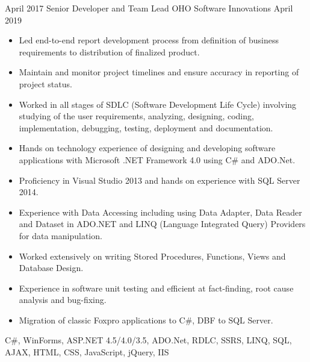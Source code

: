 \begin{experiences}
    \experience
        {April 2017}
        {Senior Developer and Team Lead}
        {OHO Software Innovations}
        {April 2019}
        {
            \begin{itemize}
                \item Led end-to-end report development process from definition of business requirements to distribution of finalized product.
                \item Maintain and monitor project timelines and ensure accuracy in reporting of project status.
                \item Worked in all stages of SDLC (Software Development Life Cycle) involving studying of the user requirements, analyzing, designing, coding, implementation, debugging, testing, deployment and documentation.
                \item Hands on technology experience of designing and developing software applications with Microsoft .NET Framework 4.0 using C# and ADO.Net.
                \item Proficiency in Visual Studio 2013 and hands on experience with SQL Server 2014.
                \item Experience with Data Accessing including using Data Adapter, Data Reader and Dataset in ADO.NET and LINQ (Language Integrated Query) Providers for data manipulation.
                \item Worked extensively on writing Stored Procedures, Functions, Views and Database Design.
                \item Experience in software unit testing and efficient at fact-finding, root cause analysis and bug-fixing.
                \item Migration of classic Foxpro applications to C#, DBF to SQL Server.
            \end{itemize}
        }
        {
            C\#,
            WinForms,
            ASP.NET 4.5/4.0/3.5,
            ADO.Net,
            RDLC,
            SSRS,
            LINQ,
            SQL,
            AJAX,
            HTML, 
            CSS, 
            JavaScript,
            jQuery,
            IIS
        }

    \emptySeparator


\end{experiences}
